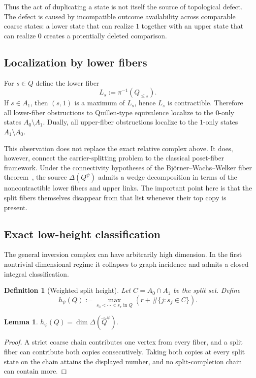 \documentclass[11pt]{article}
\newtheorem{lemma}[theorem]{Lemma}
\newtheorem{definition}[theorem]{Definition}
\begin{document}
Thus the act of duplicating a state is not itself the source of topological defect.
The defect is caused by incompatible outcome availability across comparable coarse
states: a lower state that can realize $1$ together with an upper state that can
realize $0$ creates a potentially deleted comparison.

\subsection{Localization by lower fibers}

For $s\in Q$ define the lower fiber
\[
 L_s:=\pi^{-1}(Q_{\leq s}).
\]
If $s\in A_1$, then $(s,1)$ is a maximum of $L_s$, hence $L_s$ is
contractible.  Therefore all lower-fiber obstructions to Quillen-type equivalence
localize to the $0$-only states $A_0\setminus A_1$.  Dually, all upper-fiber
obstructions localize to the $1$-only states $A_1\setminus A_0$.

This observation does not replace the exact relative complex above.  It does,
however, connect the carrier-splitting problem to the classical poset-fiber
framework.  Under the connectivity hypotheses of the Bj\"orner--Wachs--Welker
fiber theorem~\cite{BjornerWachsWelker2005}, the source $\Delta(Q^\psi)$ admits a wedge decomposition in terms
of the noncontractible lower fibers and upper links.  The important point here is
that the split fibers themselves disappear from that list whenever their top copy
is present.

\subsection{Exact low-height classification}

The general inversion complex can have arbitrarily high dimension.  In the first
nontrivial dimensional regime it collapses to graph incidence and admits a closed
integral classification.

\begin{definition}[Weighted split height]
Let $C=A_0\cap A_1$ be the split set.  Define
\[
 h_\psi(Q)
 :=\max_{s_0<\cdots<s_r\text{ in }Q}
 \left(r+\#\{j:s_j\in C\}\right).
\]
\end{definition}

\begin{lemma}\label{lem:split-height}
$h_\psi(Q)=\dim\Delta(\widehat Q^\psi)$.
\end{lemma}
\begin{proof}
A strict coarse chain contributes one vertex from every fiber, and a split fiber can
contribute both copies consecutively.  Taking both copies at every split state on the
chain attains the displayed number, and no split-completion chain can contain more.
\end{proof}
\end{document}
